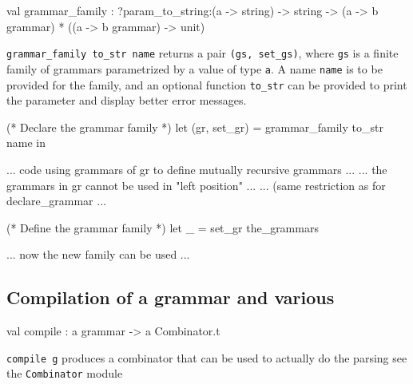 \documentclass[11pt]{article}
\begin{document}
\label{val:Grammar.grammar-underscorefamily}\begin{ocamldoccode}
val grammar_family :
  ?param_to_string:({\textquotesingle}a -> string) ->
  string -> ({\textquotesingle}a -> {\textquotesingle}b grammar) * (({\textquotesingle}a -> {\textquotesingle}b grammar) -> unit)
\end{ocamldoccode}
\begin{ocamldocdescription}
{\tt{grammar\_family to\_str name}} returns a pair {\tt{(gs, set\_gs)}}, where {\tt{gs}}
    is a finite family of grammars parametrized by a value of type {\tt{{\textquotesingle}a}}. A name
    {\tt{name}} is to be provided for the family, and an optional function {\tt{to\_str}}
    can be provided to print the parameter and display better error messages.


\end{ocamldocdescription}




\begin{ocamldoccode}

   (* Declare the grammar family *)
   let (gr, set_gr) = grammar_family to_str name in

   ... code using grammars of gr to define mutually recursive grammars ...
   ... the grammars in gr cannot be used in "left position" ...
   ... (same restriction as for declare_grammar ...

   (* Define the grammar family *)
   let _ = set_gr the_grammars

   ... now the new family can be used ...
   
\end{ocamldoccode}




\subsection{Compilation of a grammar and various}




\label{val:Grammar.compile}\begin{ocamldoccode}
val compile : {\textquotesingle}a grammar -> {\textquotesingle}a Combinator.t
\end{ocamldoccode}
\begin{ocamldocdescription}
{\tt{compile g}} produces a combinator that can be used to actually do the parsing
    see the {\tt{Combinator}} module


\end{ocamldocdescription}
\end{document}
